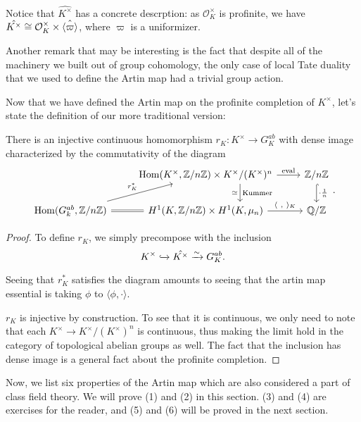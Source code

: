 Notice that \(\hat{K^{\times}}\) has a concrete descrption:
as  \(\mathcal{O}_{K}^{\times}\) is profinite, we have
\(\hat{K^{\times}} \cong \mathcal{O}_{K}^{\times} \times 
\hat{\langle\varpi\rangle}\), where \(\varpi\) is a uniformizer.

Another remark that may be interesting is the fact that despite all of
the machinery we built out of group cohomology, the only
case of local Tate duality that we used to define the Artin map
had a trivial group action.

Now that we have defined the Artin map on the profinite completion
of \(K^{\times}\), let's state the definition of our more traditional
version:

\begin{theorem}
	There is an injective continuous homomorphism 
	$r_K:K^{\times}\to G_K^{ab}$ with dense image characterized 
	by the commutativity of the diagram
	\[
	\begin{tikzcd}
		& \Hom(K^{\times},\ZZ/n\ZZ)\times K^{\times}/(K^{\times})^{n}\ar[d,shift left=3.5em,"\text{Kummer}","\simeq"']\ar{r}{\text{eval}} & \ZZ/n\ZZ\ar[hookrightarrow]{d}{\cdot\frac{1}{n}}\\
		\Hom(G_k^{ab},\ZZ/n\ZZ)\ar{ur}{r_K^{*}}\ar[equals]{r} & H^{1}(K,\ZZ/n\ZZ)\times H^{1}(K,\mu_n)\ar{r}{\langle\ ,\ \rangle_K} & \QQ/\ZZ 
	\end{tikzcd}
	.\] 
\end{theorem}

\begin{proof}
	To define \(r_{K}\), we simply precompose with the inclusion
	\[
		K^{\times} \xhookrightarrow{} \hat{K^{\times}} \xrightarrow{\sim}
		G_{K}^{ab}
	.\] 
	
	Seeing that \(r_{K}^{*}\) satisfies the diagram
	amounts to seeing that the artin map essential is
	taking \(\phi\) to \(\langle \phi, \cdot \rangle\).

	\(r_{K}\) is injective by construction.
	To see that it is continuous, we only need to note
	that each \(K^{\times} \to K^{\times} / (K^{\times})^{n}\) 
	is continuous, thus making the limit hold in the
	category of topological abelian groups as well.
	The fact that the inclusion has dense image is a general fact
	about the profinite completion.
\end{proof}

Now, we list six properties of the Artin map which are also 
considered a part of class field theory.
We will prove (1) and (2) in this section. 
(3) and (4) are exercises for the reader, and 
(5) and (6) will be proved in the next section.

